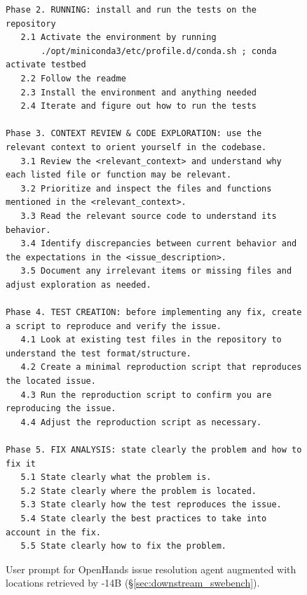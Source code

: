 \begin{figure}[!h]
\begin{tcolorbox}[colback=blue!6!white, colframe=blue!45!white, title={\small User Prompt for OpenHands Issue Resolution Agent Augmented with Locations Retrieved by \methodname-14B (continued)}]
\begin{lstlisting}[basicstyle=\fontsize{7.7}{8}\ttfamily]
Phase 2. RUNNING: install and run the tests on the repository
   2.1 Activate the environment by running  
       ./opt/miniconda3/etc/profile.d/conda.sh ; conda activate testbed
   2.2 Follow the readme
   2.3 Install the environment and anything needed
   2.4 Iterate and figure out how to run the tests

Phase 3. CONTEXT REVIEW & CODE EXPLORATION: use the relevant context to orient yourself in the codebase.
   3.1 Review the <relevant_context> and understand why each listed file or function may be relevant.
   3.2 Prioritize and inspect the files and functions mentioned in the <relevant_context>.
   3.3 Read the relevant source code to understand its behavior.
   3.4 Identify discrepancies between current behavior and the expectations in the <issue_description>.
   3.5 Document any irrelevant items or missing files and adjust exploration as needed.

Phase 4. TEST CREATION: before implementing any fix, create a script to reproduce and verify the issue.
   4.1 Look at existing test files in the repository to understand the test format/structure.
   4.2 Create a minimal reproduction script that reproduces the located issue.
   4.3 Run the reproduction script to confirm you are reproducing the issue.
   4.4 Adjust the reproduction script as necessary.

Phase 5. FIX ANALYSIS: state clearly the problem and how to fix it
   5.1 State clearly what the problem is.
   5.2 State clearly where the problem is located.
   5.3 State clearly how the test reproduces the issue.
   5.4 State clearly the best practices to take into account in the fix.
   5.5 State clearly how to fix the problem.
\end{lstlisting}
\end{tcolorbox}
\caption{User prompt for OpenHands issue resolution agent augmented with locations retrieved by \methodname-14B (\S\ref{sec:downstream_swebench}).}
\label{fig:user_prompt_codescout_augment1}
\end{figure}
